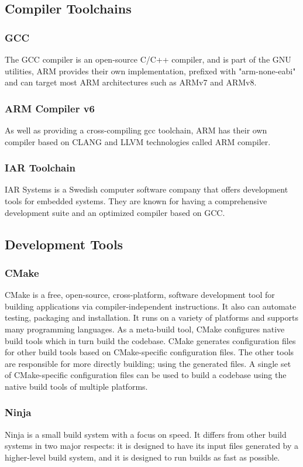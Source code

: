 \subsection{Compiler Toolchains}
\subsubsection{GCC}
The GCC compiler is an open-source C/C++ compiler, and is part of the GNU utilities, ARM provides their own implementation, prefixed with "arm-none-eabi" and can target most ARM architectures such as ARMv7 and ARMv8.
\subsubsection{ARM Compiler v6}
As well as providing a cross-compiling gcc toolchain, ARM has their own compiler based on CLANG and LLVM technologies called ARM compiler.
\subsubsection{IAR Toolchain}
IAR Systems is a Swedish computer software company that offers development tools for embedded systems. They are known for having a comprehensive development suite and an optimized compiler based on GCC.
\subsection{Development Tools}
\subsubsection{CMake}
CMake is a free, open-source, cross-platform, software development tool for building applications via compiler-independent instructions. It also can automate testing, packaging and installation. It runs on a variety of platforms and supports many programming languages.
As a meta-build tool, CMake configures native build tools which in turn build the codebase. CMake generates configuration files for other build tools based on CMake-specific configuration files. The other tools are responsible for more directly building; using the generated files. A single set of CMake-specific configuration files can be used to build a codebase using the native build tools of multiple platforms.
\subsubsection{Ninja}
Ninja is a small build system with a focus on speed. It differs from other build systems in two major respects: it is designed to have its input files generated by a higher-level build system, and it is designed to run builds as fast as possible.
